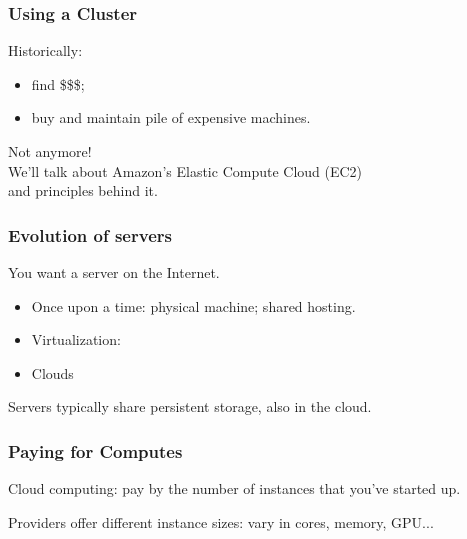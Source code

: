 \begin{frame}
  \frametitle{Using a Cluster}

  
    Historically:
\begin{itemize}
  \item find \$\$\$;
  \item buy and maintain pile of expensive machines.
\end{itemize}

  Not anymore! \\[1em]

  We'll talk about Amazon's Elastic Compute Cloud (EC2)\\ and
  principles behind it.
  
\end{frame}

\begin{frame}
  \frametitle{Evolution of servers}

  

You want a server on the Internet.
\begin{itemize}
\item 
  Once upon a time: physical machine; shared hosting.
\item Virtualization:
\item Clouds
\end{itemize}

  Servers typically share persistent storage, also in
  the cloud. 

  
\end{frame}

\begin{frame}
  \frametitle{Paying for Computes}

  
Cloud computing: pay by the number of
instances that you've started up.


Providers offer different instance sizes: vary in cores, memory, GPU...

  
\end{frame}


